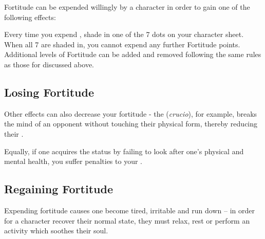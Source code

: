 Fortitude can be expended willingly by a character in order to gain one of the following effects:
\begin{enumerate}
\end{enumerate}


Every time you expend , shade in one of the 7  dots on your character sheet. When all 7 are shaded in, you cannot expend any further Fortitude points. Additional levels of Fortitude can be added and removed following the same rules as those for  discussed above.

\subsection{Losing Fortitude}

Other effects can also decrease your fortitude - the  ({\it crucio}), for example, breaks the mind of an opponent without touching their physical form, thereby reducing their . 

Equally, if one acquires the  status by failing to look after one's physical and mental health, you suffer penalties to your . 

\subsection{Regaining Fortitude}

Expending fortitude causes one become tired, irritable and run down -- in order for a character recover their normal state, they must relax, rest or perform an activity which soothes their soul. 

